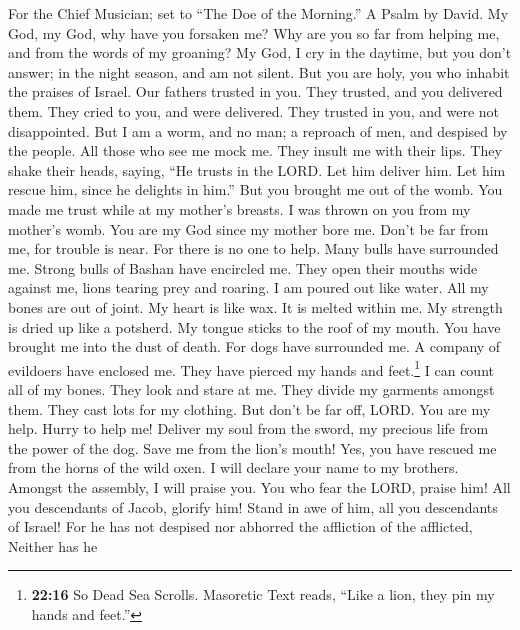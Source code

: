 For the Chief Musician; set to ``The Doe of the Morning.'' A Psalm by
David.  My God, my God, why have you forsaken me? Why are
you so far from helping me, and from the words of my groaning?
 My God, I cry in the daytime, but you don't answer; in
the night season, and am not silent.  But you are holy,
you who inhabit the praises of Israel.  Our fathers
trusted in you. They trusted, and you delivered them. 
They cried to you, and were delivered. They trusted in you, and were not
disappointed.  But I am a worm, and no man; a reproach of
men, and despised by the people.  All those who see me
mock me. They insult me with their lips. They shake their heads, saying,
 ``He trusts in the LORD. Let him deliver him. Let him
rescue him, since he delights in him.''  But you brought
me out of the womb. You made me trust while at my mother's breasts.
 I was thrown on you from my mother's womb. You are my
God since my mother bore me.  Don't be far from me, for
trouble is near. For there is no one to help.  Many bulls
have surrounded me. Strong bulls of Bashan have encircled me.
 They open their mouths wide against me, lions tearing
prey and roaring.  I am poured out like water. All my
bones are out of joint. My heart is like wax. It is melted within me.
 My strength is dried up like a potsherd. My tongue
sticks to the roof of my mouth. You have brought me into the dust of
death.  For dogs have surrounded me. A company of
evildoers have enclosed me. They have pierced my hands and
feet.\footnote{\textbf{22:16} So Dead Sea Scrolls. Masoretic Text reads,
  ``Like a lion, they pin my hands and feet.''}  I can
count all of my bones. They look and stare at me.  They
divide my garments amongst them. They cast lots for my clothing.
 But don't be far off, LORD. You are my help. Hurry to
help me!  Deliver my soul from the sword, my precious
life from the power of the dog.  Save me from the lion's
mouth! Yes, you have rescued me from the horns of the wild oxen.
 I will declare your name to my brothers. Amongst the
assembly, I will praise you.  You who fear the LORD,
praise him! All you descendants of Jacob, glorify him! Stand in awe of
him, all you descendants of Israel!  For he has not
despised nor abhorred the affliction of the afflicted, Neither has he
